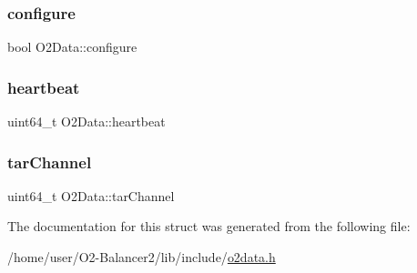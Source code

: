 \subsubsection{\texorpdfstring{configure}{configure}}
{\footnotesize\ttfamily bool O2\+Data\+::configure}

\mbox{\label{structO2Data_a135569ac2e921d53f529feb03658b591}} 
\subsubsection{\texorpdfstring{heartbeat}{heartbeat}}
{\footnotesize\ttfamily uint64\+\_\+t O2\+Data\+::heartbeat}

\mbox{\label{structO2Data_a014a1e616d7f89e4af1358ae6c9a2a9a}} 
\subsubsection{\texorpdfstring{tar\+Channel}{tarChannel}}
{\footnotesize\ttfamily uint64\+\_\+t O2\+Data\+::tar\+Channel}



The documentation for this struct was generated from the following file\+:\begin{DoxyCompactItemize}
\item 
/home/user/\+O2-\/\+Balancer2/lib/include/\hyperlink{o2data_8h}{o2data.\+h}\end{DoxyCompactItemize}
